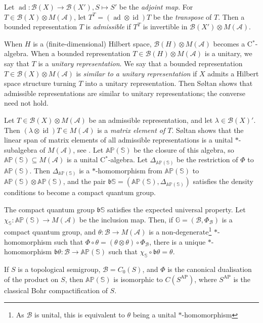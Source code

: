 \documentclass[twoside,a4paper]{article}
\theoremstyle{definition}
\theoremstyle{remark}
\newcommand{\ap}{{\operatorname{AP}}}
\newcommand{\AP}{{\mathbb{AP}}}
\newcommand{\ad}{{\operatorname{ad}}}
\newcommand{\mc}{\mathcal}
\newcommand{\mf}{\mathfrak}
\newcommand{\id}{\operatorname{id}}
\begin{document}
Let $\ad:\mc B(X)\rightarrow\mc B(X'), S\mapsto S'$ be the \emph{adjoint map}.
For $T\in\mc B(X)\otimes M(\mc A)$, let $T^T = (\ad\otimes\id)T$ be the
\emph{transpose} of $T$.  Then a bounded representation $T$ is \emph{admissible}
if $T^T$ is invertible in $\mc B(X')\otimes M(\mc A)$.

When $H$ is a (finite-dimensional) Hilbert space, $\mc B(H)\otimes M(\mc A)$ becomes
a C$^*$-algebra.  When a bounded representation $T\in\mc B(H)\otimes M(\mc A)$
is a unitary, we say that $T$ is a \emph{unitary representation}.  We say that a bounded
representation $T\in\mc B(X)\otimes M(\mc A)$ is \emph{similar to a unitary
representation} if $X$ admits a Hilbert space structure turning $T$ into a unitary
representation.  Then S{\o}ltan shows that admissible representations are similar
to unitary representations; the converse need not hold.

Let $T\in\mc B(X)\otimes M(\mc A)$ be an admissible representation, and let
$\lambda\in\mc B(X)'$.  Then $(\lambda\otimes\id)T\in M(\mc A)$ is a \emph{matrix
element of $T$}.  S{\o}ltan shows that the linear span of matrix elements of
all admissible representations is a unital $*$-subalgebra of $M(\mc A)$, see
\cite[Proposition~2.12]{soltan}.  Let $\AP(\mathbb S)$ be the closure of this
algebra, so $\AP(\mathbb S)\subseteq M(\mc A)$ is a unital C$^*$-algebra.  Let
$\Delta_{\AP(\mathbb S)}$ be the restriction of $\Phi$ to $\AP(\mathbb S)$.
Then $\Delta_{\AP(\mathbb S)}$ is a $*$-homomorphism from $\AP(\mathbb S)$ to
$\AP(\mathbb S)\otimes\AP(\mathbb S)$, and the pair $\mf b\mathbb S =
(\AP(\mathbb S),\Delta_{\AP(\mathbb S)})$ satisfies the density conditions
to become a compact quantum group.

The compact quantum group $\mf b\mathbb S$ satisfies the expected universal
property.  Let $\chi_{\mathbb S}:\AP(\mathbb S)\rightarrow M(\mc A)$ be the
inclusion map.  Then, if $\mathbb G=(\mc B,\Phi_\mc B)$ is a compact quantum group,
and $\theta:\mc B\rightarrow M(\mc A)$ is a non-degenerate\footnote{As $\mc B$ is
unital, this is equivalent to $\theta$ being a unital $*$-homomorphism} $*$-homomorphism such
that $\Phi\circ\theta = (\theta\otimes\theta)\circ \Phi_{\mc B}$, there is a unique
$*$-homomorphism $\mf b\theta:\mc B\rightarrow\AP(\mathbb S)$ such that
$\chi_{\mathbb S} \circ \mf b\theta = \theta$.

If $S$ is a topological semigroup, $\mc B=C_0(S)$, and $\Phi$ is the canonical
dualisation of the product on $S$, then $\AP(\mathbb S)$ is isomorphic to
$C(S^\ap)$, where $S^\ap$ is the classical Bohr compactification of $S$.
\end{document}
